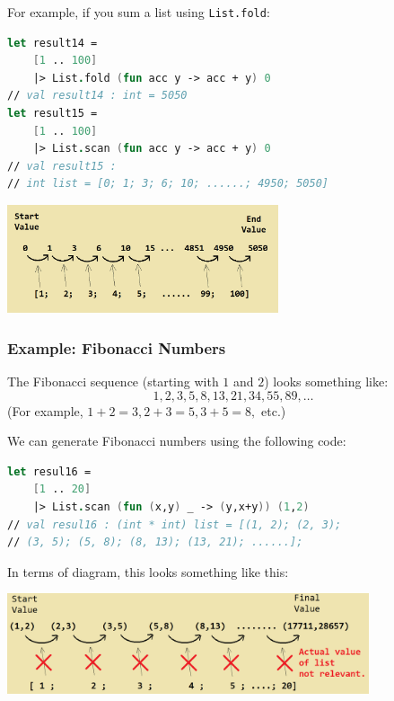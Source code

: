 \documentclass[12pt]{article}
\begin{document}
For example, if you sum a list using \texttt{List.fold}:
\begin{lstlisting}[language=FSharp]
let result14 = 
    [1 .. 100]
    |> List.fold (fun acc y -> acc + y) 0
// val result14 : int = 5050
let result15 = 
    [1 .. 100]
    |> List.scan (fun acc y -> acc + y) 0
// val result15 : 
// int list = [0; 1; 3; 6; 10; ......; 4950; 5050]
\end{lstlisting}
\begin{center}
\includegraphics[width=0.6\textwidth]{pictures/picture34.png}
\end{center}

\subsubsection*{Example: Fibonacci Numbers}
The Fibonacci sequence (starting with $1$ and $2$) looks something like:
\[
1, 2, 3, 5, 8, 13, 21, 34, 55, 89, \ldots
\]
(For example, $1 + 2 = 3, 2 + 3 = 5, 3 + 5 = 8,$ etc.) 

We can generate Fibonacci numbers using the following code:
\begin{lstlisting}[language=FSharp]
let resul16 =
    [1 .. 20]
    |> List.scan (fun (x,y) _ -> (y,x+y)) (1,2)
// val resul16 : (int * int) list = [(1, 2); (2, 3); 
// (3, 5); (5, 8); (8, 13); (13, 21); ......];
\end{lstlisting}
In terms of diagram, this looks something like this:
\begin{center}
\includegraphics[width=0.8\textwidth]{pictures/picture38.png}
\end{center}

\pagebreak
\end{document}
